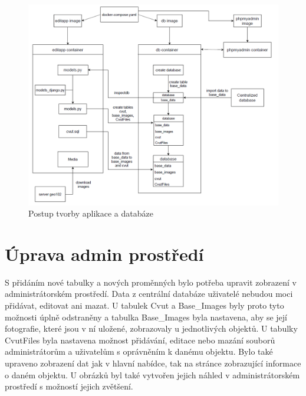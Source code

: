 \begin{figure}[H] \centering
    \includegraphics[width=400pt]{./pictures/diagram-docker.PNG}
    \caption[Postup tvorby aplikace a databáze]{Postup tvorby aplikace a databáze}
	\label{fig:Postup tvorby aplikace a databáze}              
\end{figure}


\newpage

\section{Úprava admin prostředí}

S přidáním nové tabulky a nových proměnných bylo potřeba upravit
zobrazení v administrátorském prostředí. Data z centrální databáze
uživatelé nebudou moci přidávat, editovat ani mazat. U tabulek
Cvut a Base\_Images byly proto tyto možnosti úplně odstraněny a tabulka
Base\_Images byla nastavena, aby se její fotografie, které jsou v ní
uložené, zobrazovaly u jednotlivých objektů. U tabulky CvutFiles byla
nastavena možnost přidávání, editace nebo mazání souborů
administrátorům a uživatelům s oprávněním k danému objektu. Bylo také
upraveno zobrazení dat jak v hlavní nabídce, tak na stránce
zobrazující informace o daném objektu. U obrázků byl také vytvořen
jejich náhled v administrátorském prostředí s možností jejich
zvětšení.

